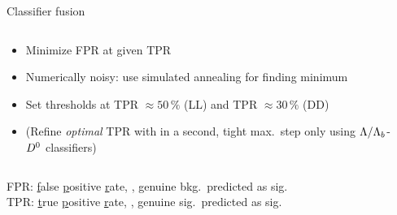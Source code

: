 \begin{frame}{Classifier fusion}
    \begin{columns}
        \begin{column}{.5\textwidth}
            \scalebox{1.2}{Optimize rect.\ cut clf.}
            \begin{itemize}
                \item Minimize FPR\ftnt{} at given TPR\ftnt\ftnt{}
                \item Numerically noisy: use simulated annealing for finding minimum 
                \item Set thresholds at TPR $\approx 50\,\%$ (LL) and TPR $\approx 30\,\%$ (DD)
                \item (Refine \textit{optimal} TPR with in a second, tight max.\ step only using ${\Lambda} / {{\Lambda}_{b}}$-${{D}^0}$ classifiers\ftntdagger)
            \end{itemize}
        \end{column}
        \begin{column}{.5\textwidth}
        \end{column}
    \end{columns}

    \vspace{5mm}

    \footnotesize
    \phantom{\ftnt}\ftnt FPR: \underline{f}alse \underline{p}ositive \underline{r}ate, \ie{}, genuine bkg.\ predicted as sig.\\
    \ftnt\ftnt TPR: \underline{t}rue \underline{p}ositive \underline{r}ate, \ie{}, genuine sig.\ predicted as sig.
\end{frame}
